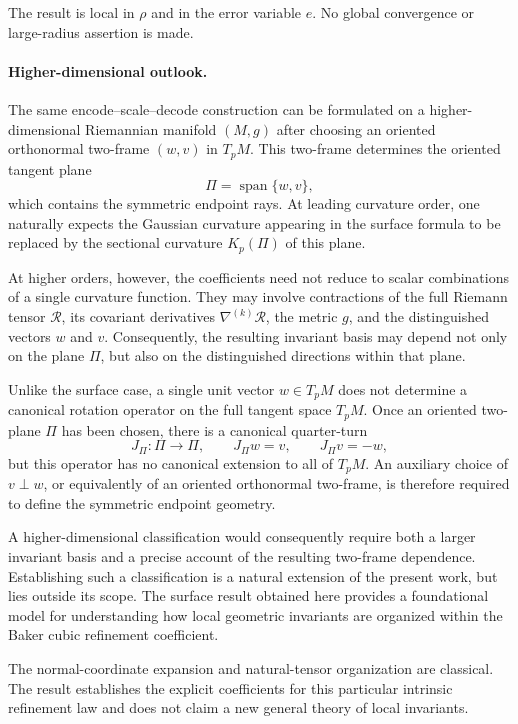 \documentclass[11pt]{amsart}
\numberwithin{equation}{section}
\theoremstyle{remark}
\newcommand{\Riem}{\mathcal{R}}
\newcommand{\Span}{\operatorname{span}}
\begin{document}
The result is local in $\rho$ and in the error variable $e$.  No global
convergence or large-radius assertion is made.

\paragraph{Higher-dimensional outlook.}
The same encode--scale--decode construction can be formulated on a
higher-dimensional Riemannian manifold $(M,g)$ after choosing an oriented
orthonormal two-frame $(w,v)$ in $T_pM$.  This two-frame determines the
oriented tangent plane
\[
\Pi=\Span\{w,v\},
\]
which contains the symmetric endpoint rays.  At leading curvature order,
one naturally expects the Gaussian curvature appearing in the surface
formula to be replaced by the sectional curvature $K_p(\Pi)$ of this plane.

At higher orders, however, the coefficients need not reduce to scalar
combinations of a single curvature function.  They may involve contractions
of the full Riemann tensor $\Riem$, its covariant derivatives
$\nabla^{(k)}\Riem$, the metric $g$, and the distinguished vectors $w$ and $v$.
Consequently, the resulting invariant basis may depend not only on the plane
$\Pi$, but also on the distinguished directions within that plane.

Unlike the surface case, a single unit vector $w\in T_pM$ does not determine
a canonical rotation operator on the full tangent space $T_pM$.  Once an
oriented two-plane $\Pi$ has been chosen, there is a canonical quarter-turn
\[
J_{\Pi}\colon \Pi\longrightarrow\Pi,
\qquad
J_{\Pi}w=v,
\qquad
J_{\Pi}v=-w,
\]
but this operator has no canonical extension to all of $T_pM$.  An auxiliary
choice of $v\perp w$, or equivalently of an oriented orthonormal two-frame,
is therefore required to define the symmetric endpoint geometry.

A higher-dimensional classification would consequently require both a
larger invariant basis and a precise account of the resulting two-frame
dependence.  Establishing such a classification is a natural extension of
the present work, but lies outside its scope.  The surface result obtained
here provides a foundational model for understanding how local geometric
invariants are organized within the Baker cubic refinement coefficient.

The normal-coordinate expansion and natural-tensor organization are
classical.  The result establishes the explicit coefficients for this
particular intrinsic refinement law and does not claim a new general theory
of local invariants.
\end{document}
